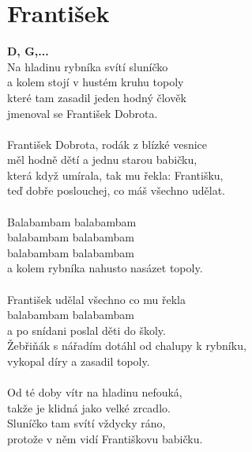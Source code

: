\section{František}
\footnotesize\textbf{D, G,...}\\
\normalsize
{}Na hladinu rybníka svítí sluníčko\\
a kolem stojí v hustém kruhu topoly\\
které tam zasadil jeden hodný člověk\\
jmenoval se František Dobrota.\\
\\
František Dobrota, rodák z blízké vesnice\\
měl hodně dětí a jednu starou babičku,\\
která když umírala, tak mu řekla: Františku,\\
teď dobře poslouchej, co máš všechno udělat.\\
\\
Balabambam balabambam\\
balabambam balabambam\\
balabambam balabambam\\
a kolem rybníka nahusto nasázet topoly.\\
\\
František udělal všechno co mu řekla\\
balabambam balabambam\\
a po snídani poslal děti do školy.\\
Žebřiňák s nářadím dotáhl od chalupy k rybníku,\\
vykopal díry a zasadil topoly.\\
\\
Od té doby vítr na hladinu nefouká,\\
takže je klidná jako velké zrcadlo.\\
Sluníčko tam svítí vždycky ráno,\\
protože v něm vidí Františkovu babičku.\\